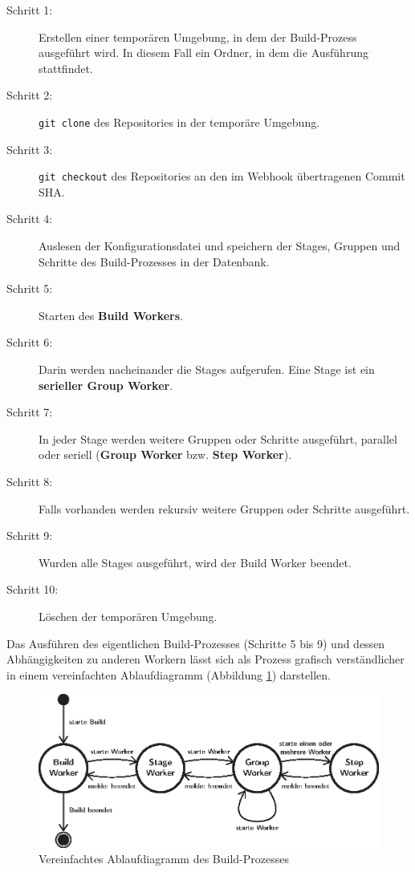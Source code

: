 \begin{description}
  \item[Schritt 1:] Erstellen einer temporären Umgebung, in dem der Build-Prozess ausgeführt wird. In diesem Fall ein Ordner, in dem die Ausführung stattfindet.
  \item[Schritt 2:] \texttt{git clone} des Repositories in der temporäre Umgebung.
  \item[Schritt 3:] \texttt{git checkout} des Repositories an den im Webhook übertragenen Commit SHA.
  \item[Schritt 4:] Auslesen der Konfigurationsdatei und speichern der Stages, Gruppen und Schritte des Build-Prozesses in der Datenbank.
  \item[Schritt 5:] Starten des \textbf{Build Workers}.
  \item[Schritt 6:] Darin werden nacheinander die Stages aufgerufen. Eine Stage ist ein \textbf{serieller Group Worker}.
  \item[Schritt 7:] In jeder Stage werden weitere Gruppen oder Schritte ausgeführt, parallel oder seriell (\textbf{Group Worker} bzw. \textbf{Step Worker}).
  \item[Schritt 8:] Falls vorhanden werden rekursiv weitere Gruppen oder Schritte ausgeführt.
  \item[Schritt 9:] Wurden alle Stages ausgeführt, wird der Build Worker beendet.
  \item[Schritt 10:] Löschen der temporären Umgebung.
\end{description}

Das Ausführen des eigentlichen Build-Prozesses (Schritte 5 bis 9) und dessen Abhängigkeiten zu anderen Workern lässt sich als Prozess grafisch verständlicher in einem vereinfachten Ablaufdiagramm (Abbildung \ref{fig:ablauf-build-prozess}) darstellen.

\begin{figure}[h]
  \caption{Vereinfachtes Ablaufdiagramm des Build-Prozesses}
  \label{fig:ablauf-build-prozess}
  \centering
    \includegraphics[width=\textwidth]{assets/worker_diagram}
\end{figure}

